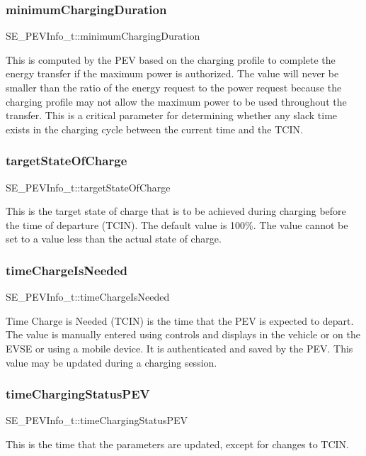 \subsubsection{\texorpdfstring{minimum\+Charging\+Duration}{minimumChargingDuration}}
{\footnotesize\ttfamily S\+E\+\_\+\+P\+E\+V\+Info\+\_\+t\+::minimum\+Charging\+Duration}

This is computed by the P\+EV based on the charging profile to complete the energy transfer if the maximum power is authorized. The value will never be smaller than the ratio of the energy request to the power request because the charging profile may not allow the maximum power to be used throughout the transfer. This is a critical parameter for determining whether any slack time exists in the charging cycle between the current time and the T\+C\+IN. \mbox{\label{group__PEVInfo_ga36d8d6c62de4e5fe59431faa1f847189}} 
\subsubsection{\texorpdfstring{target\+State\+Of\+Charge}{targetStateOfCharge}}
{\footnotesize\ttfamily S\+E\+\_\+\+P\+E\+V\+Info\+\_\+t\+::target\+State\+Of\+Charge}

This is the target state of charge that is to be achieved during charging before the time of departure (T\+C\+IN). The default value is 100\%. The value cannot be set to a value less than the actual state of charge. \mbox{\label{group__PEVInfo_ga2f882d30896a2cc714f4e3c852e4fc74}} 
\subsubsection{\texorpdfstring{time\+Charge\+Is\+Needed}{timeChargeIsNeeded}}
{\footnotesize\ttfamily S\+E\+\_\+\+P\+E\+V\+Info\+\_\+t\+::time\+Charge\+Is\+Needed}

Time Charge is Needed (T\+C\+IN) is the time that the P\+EV is expected to depart. The value is manually entered using controls and displays in the vehicle or on the E\+V\+SE or using a mobile device. It is authenticated and saved by the P\+EV. This value may be updated during a charging session. \mbox{\label{group__PEVInfo_ga3c4bef34dcb71114ec8bc685a1df5280}} 
\subsubsection{\texorpdfstring{time\+Charging\+Status\+P\+EV}{timeChargingStatusPEV}}
{\footnotesize\ttfamily S\+E\+\_\+\+P\+E\+V\+Info\+\_\+t\+::time\+Charging\+Status\+P\+EV}

This is the time that the parameters are updated, except for changes to T\+C\+IN. 